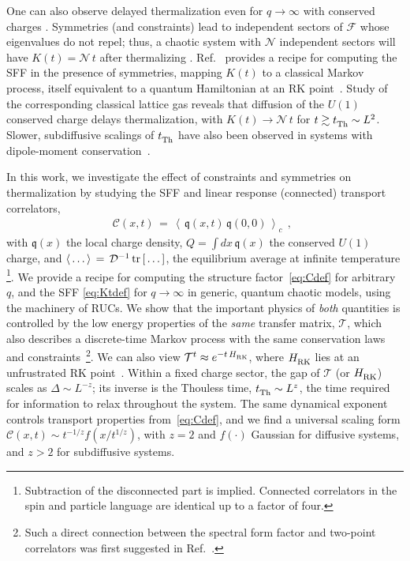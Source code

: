 \documentclass[prl,aps,amsfonts,twocolumn,superscriptaddress,notitlepage,floatfix]{revtex4-1}
\newcommand{\be}{\begin{eqnarray}}
\newcommand{\ee}{\end{eqnarray}}
\newcommand{\vpd}[0]{\vphantom{\dagger}}
\newcommand{\expval}[1]{ \left\langle #1 \right\rangle}
\newcommand{\tr}[1]{{\rm tr} \left[ #1 \right]}
\def\Floq{\mathcal{F}}
\def\Ham{H}
\def\Tmat{\mathcal{T}}
\def\tth{t^{\vpd}_{\rm Th}}
\def\Hdim{\mathcal{D}}
\def\Ldim{q}
\def\gap{\Delta}
\def\charge{\mathfrak{q}}
\def\totcharge{Q}
\def\Corr{\mathcal{C}}
\def\numsec{\mathcal{N}}
\begin{document}
One can also observe delayed thermalization even for $\Ldim \to \infty$ with conserved charges \cite{ShenkerRMT,U1FRUC}. Symmetries (and constraints) lead to independent sectors of $\Floq$ whose eigenvalues do not repel; thus, a chaotic system with $\numsec$ independent sectors will have $K(t) = \numsec \, t$ after thermalizing \cite{U1FRUC}. Ref.~ provides a recipe for computing the SFF in the presence of symmetries, mapping $K(t)$ to a classical Markov process, itself equivalent to a quantum Hamiltonian at an RK point~\cite{RK,U1FRUC,SanjayAmosFracton}. Study of the corresponding classical lattice gas reveals that diffusion of the $U(1)$ conserved charge delays thermalization, with $K(t) \to \numsec \, t$ for $t \gtrsim \tth \sim L^2$. Slower, subdiffusive scalings of $\tth$ have also been observed in systems with dipole-moment conservation~\cite{SanjayAmosFracton}.


In this work, we investigate the effect of constraints and symmetries on thermalization by studying the SFF and linear response (connected) transport correlators,
%
\be \label{eq:Cdef}
\Corr (x,t) \, = \, \expval{\, \charge (x,t) \, \charge (0,0) \, }^{\,}_{c} ~~,~~
\ee
% 
with $\charge (x)$ the local charge density, $\totcharge =\int dx \, \charge (x)$ the conserved $U(1)$ charge, and $\expval{ \, \dots \, } \,  = \, \Hdim^{-1} \, \tr{\, \dots \,}$, the equilibrium average at infinite temperature \footnote{Subtraction of the disconnected part is implied. Connected correlators in the spin and particle language are identical up to a factor of four.}. We provide a recipe for computing the structure factor~\eqref{eq:Cdef} for arbitrary $\Ldim$, and the SFF \eqref{eq:Ktdef} for $\Ldim \to \infty$ in generic, quantum chaotic models, using the machinery of RUCs. We show that the important physics of \emph{both} quantities is controlled by the low energy properties of the \emph{same} transfer matrix, $\Tmat$, which also describes a discrete-time Markov process with the same conservation laws and constraints~\footnote{Such a direct connection between the spectral form factor and two-point correlators was first suggested in Ref.~.}. We can also view $\Tmat^{t} \approx e^{- t \, \Ham^{\,}_{\rm RK}}$, where $\Ham^{\,}_{\rm RK}$ lies at an unfrustrated RK point~\cite{RK,U1FRUC,SanjayAmosFracton}. Within a fixed charge sector, the gap of $\Tmat$ (or $\Ham^{\,}_{\rm RK}$) scales as $\gap \sim L^{-z}$; its inverse is the Thouless time, $\tth \sim L^z$, the time required for information to relax throughout the system. The same dynamical exponent controls transport properties from~\eqref{eq:Cdef}, and we find a universal scaling form $ \Corr (x,t) \sim t^{-1/z} f(x/t^{1/z})$, with $z=2$ and $f(\cdot)$ Gaussian for diffusive systems, and $z>2$ for subdiffusive systems.
\end{document}
